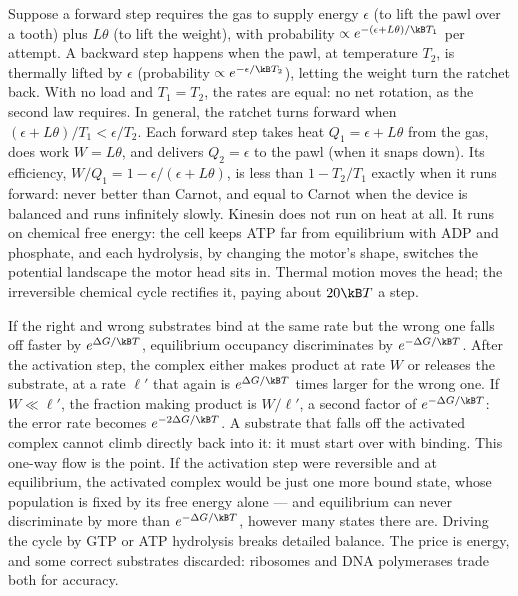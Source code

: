  Suppose a forward step requires the gas to supply energy $\epsilon$ (to lift the pawl over a tooth) plus $L\theta$ (to lift the weight), with probability $\propto e^{-(\epsilon+L\theta)/\kB T_1}$ per attempt. A backward step happens when the pawl, at temperature $T_2$, is thermally lifted by $\epsilon$ (probability $\propto e^{-\epsilon/\kB T_2}$), letting the weight turn the ratchet back. With no load and $T_1 = T_2$, the rates are equal: no net rotation, as the second law requires. In general, the ratchet turns forward when $(\epsilon+L\theta)/T_1<\epsilon/T_2$. Each forward step takes heat $Q_1 = \epsilon+L\theta$ from the gas, does work $W = L\theta$, and delivers $Q_2 = \epsilon$ to the pawl (when it snaps down). Its efficiency, $W/Q_1 = 1 - \epsilon/(\epsilon+L\theta)$, is less than $1 - T_2/T_1$ exactly when it runs forward: never better than Carnot, and equal to Carnot when the device is balanced and runs infinitely slowly. Kinesin does not run on heat at all. It runs on chemical free energy: the cell keeps ATP far from equilibrium with ADP and phosphate, and each hydrolysis, by changing the motor's shape, switches the potential landscape the motor head sits in. Thermal motion moves the head; the irreversible chemical cycle rectifies it, paying about $20\kB T$ a step.

 If the right and wrong substrates bind at the same rate but the wrong one falls off faster by $e^{\Delta G/\kB T}$, equilibrium occupancy discriminates by $e^{-\Delta G/\kB T}$. After the activation step, the complex either makes product at rate $W$ or releases the substrate, at a rate $\ell'$ that again is $e^{\Delta G/\kB T}$ times larger for the wrong one. If $W\ll\ell'$, the fraction making product is $W/\ell'$, a second factor of $e^{-\Delta G/\kB T}$: the error rate becomes $e^{-2\Delta G/\kB T}$. A substrate that falls off the activated complex cannot climb directly back into it: it must start over with binding. This one-way flow is the point. If the activation step were reversible and at equilibrium, the activated complex would be just one more bound state, whose population is fixed by its free energy alone --- and equilibrium can never discriminate by more than $e^{-\Delta G/\kB T}$, however many states there are. Driving the cycle by GTP or ATP hydrolysis breaks detailed balance. The price is energy, and some correct substrates discarded: ribosomes and DNA polymerases trade both for accuracy.
